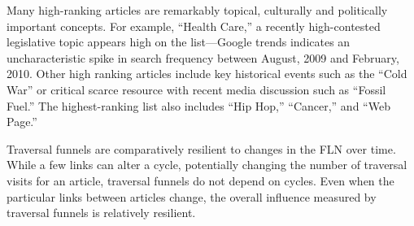 \documentclass[pre,twocolumn,twoside,byrevtex,superscriptaddress,floatfix]{revtex4-1}
\begin{document}
Many high-ranking articles are remarkably topical, culturally and politically important concepts.  For example, ``Health Care,'' a recently high-contested legislative topic appears high on the list---Google trends indicates an uncharacteristic spike in search frequency between August, 2009 and February, 2010.
Other high ranking articles include key historical events such as the ``Cold War'' or critical scarce resource with recent 
media discussion such as ``Fossil Fuel.'' 
The highest-ranking list also includes ``Hip Hop,'' ``Cancer,'' and ``Web Page.''

Traversal funnels are comparatively resilient to changes in the FLN over time. While a few links can alter a cycle, potentially changing the number of traversal visits for an article, traversal funnels do not depend on cycles. Even when the particular links between articles change, the overall influence measured by traversal funnels is relatively resilient. 
\end{document}
